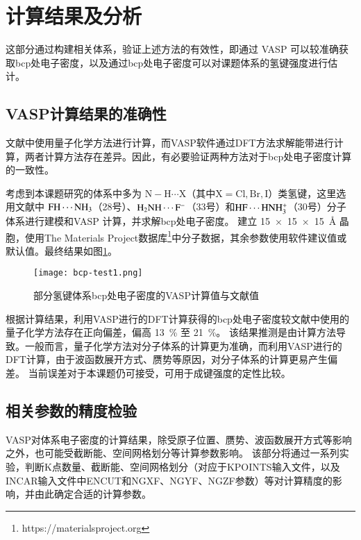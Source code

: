 \section{计算结果及分析}

这部分通过构建相关体系，验证上述方法的有效性，即通过 VASP 可以较准确获取bcp处电子密度，以及通过bcp处电子密度可以对课题体系的氢键强度进行估计。

\subsection{VASP计算结果的准确性}

文献中使用量子化学方法进行计算，而VASP软件通过DFT方法求解能带进行计算，两者计算方法存在差异。因此，有必要验证两种方法对于bcp处电子密度计算的一致性。

考虑到本课题研究的体系中多为 $\mathrm{N}-\mathrm{H}\cdots\mathrm{X}$（其中$\mathrm{X}=\mathrm{Cl,Br,I}$）类氢键，这里选用文献中 $\rm FH \cdots NH_3$（28号）、$\rm H_2NH \cdots F^-$（33号）和$\rm HF\cdots HNH_3^+$（30号）分子体系进行建模和VASP 计算，并求解bcp处电子密度。
建立 \SI{15x15x15}{\angstrom} 晶胞，使用The Materials Project数据库\footnote{https://materialsproject.org}中分子数据，其余参数使用软件建议值或默认值。最终结果如图\ref{fig:bcp-test1}。

\begin{figure}[htbp]
    \centering
    \texttt{[image: bcp-test1.png]}
    \caption{部分氢键体系bcp处电子密度的VASP计算值与文献值}
    \label{fig:bcp-test1}
\end{figure}

根据计算结果，利用VASP进行的DFT计算获得的bcp处电子密度较文献中使用的量子化学方法存在正向偏差，偏高 \SI{13}{\percent} 至 \SI{21}{\percent}。
该结果推测是由计算方法导致。一般而言，量子化学方法对分子体系的计算更为准确，而利用VASP进行的DFT计算，由于波函数展开方式、赝势等原因，对分子体系的计算更易产生偏差。
当前误差对于本课题仍可接受，可用于成键强度的定性比较。

\subsection{相关参数的精度检验}

VASP对体系电子密度的计算结果，除受原子位置、赝势、波函数展开方式等影响之外，也可能受截断能、空间网格划分等计算参数影响。
该部分将通过一系列实验，判断K点数量、截断能、空间网格划分（对应于KPOINTS输入文件，以及INCAR输入文件中ENCUT和NGXF、NGYF、NGZF参数）等对计算精度的影响，并由此确定合适的计算参数。

